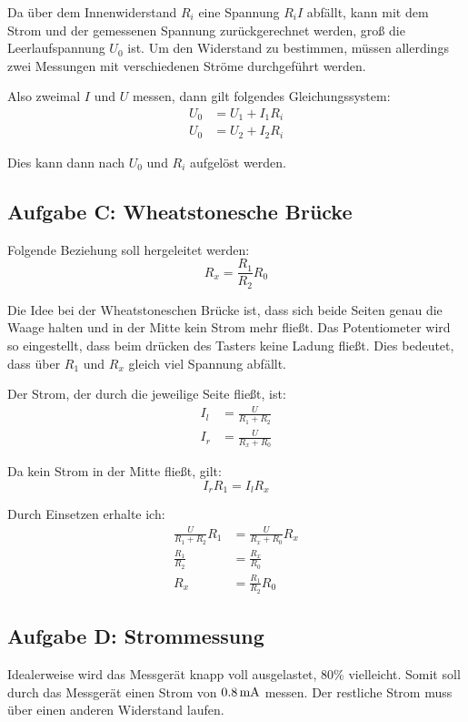 \documentclass[11pt]{article}
\begin{document}
Da über dem Innenwiderstand $R_i$ eine Spannung $R_i I$ abfällt, kann
mit dem Strom und der gemessenen Spannung zurückgerechnet werden, groß
die Leerlaufspannung $U_0$ ist. Um den Widerstand zu bestimmen, müssen
allerdings zwei Messungen mit verschiedenen Ströme durchgeführt werden.

Also zweimal $I$ und $U$ messen, dann gilt folgendes Gleichungssystem:
\begin{align*}
	U_0 &= U_1 + I_1 R_i \\
	U_0 &= U_2 + I_2 R_i
\end{align*}

Dies kann dann nach $U_0$ und $R_i$ aufgelöst werden.

\subsection{Aufgabe C: Wheatstonesche Brücke}

Folgende Beziehung soll hergeleitet werden:
\[ R_x = \frac{R_1}{R_2} R_0 \]

Die Idee bei der Wheatstoneschen Brücke ist, dass sich beide Seiten
genau die Waage halten und in der Mitte kein Strom mehr fließt. Das
Potentiometer wird so eingestellt, dass beim drücken des Tasters keine
Ladung fließt. Dies bedeutet, dass über $R_1$ und $R_x$ gleich viel
Spannung abfällt.

Der Strom, der durch die jeweilige Seite fließt, ist:
\begin{align*}
	I_l &= \frac U{R_1 + R_2} \\
	I_r &= \frac U{R_x + R_0}
\end{align*}

Da kein Strom in der Mitte fließt, gilt:
\[ I_r R_1 = I_l R_x \]

Durch Einsetzen erhalte ich:
\begin{align*}
	\frac U{R_1 + R_2} R_1 &= \frac U{R_x + R_0} R_x \\
	\frac {R_1}{R_2}  &= \frac {R_x}{R_0} \\
	R_x &= \frac {R_1}{R_2} R_0
\end{align*}

\subsection{Aufgabe D: Strommessung}

Idealerweise wird das Messgerät knapp voll ausgelastet, 80\% vielleicht.  Somit
soll durch das Messgerät einen Strom von $\unit[0.8]{mA}$ messen. Der restliche
Strom muss über einen anderen Widerstand laufen.
\end{document}

